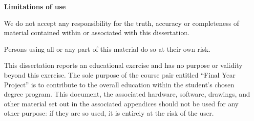 \begin{center}
\textbf{\LARGE Limitations of use}
\end{center}
\vspace{12pt}
We do not accept any responsibility for the truth, accuracy or completeness of material contained within or associated with this dissertation.

Persons using all or any part of this material do so at their own risk.

This dissertation reports an educational exercise and has no purpose or validity beyond this exercise. The sole purpose of the course pair entitled “Final Year Project” is to contribute to the overall education within the student’s chosen degree program. This document, the associated hardware, software, drawings, and other material set out in the associated appendices should not be used for any other purpose: if they are so used, it is entirely at the risk of the user.
